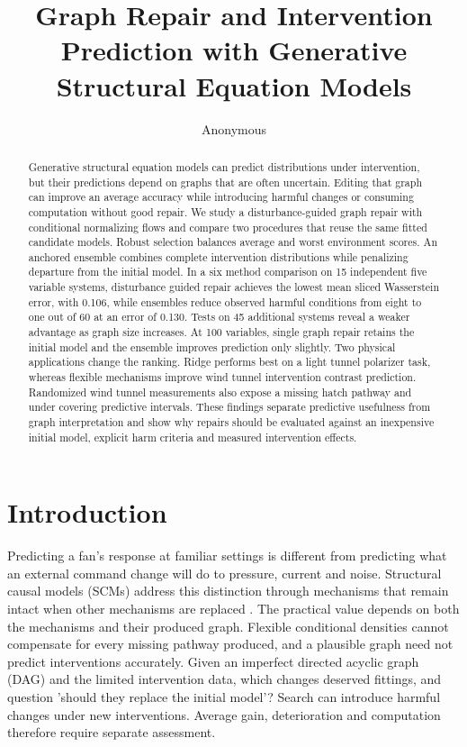 \documentclass{svproc}
\begin{document}
\mainmatter
\title{Graph Repair and Intervention Prediction with Generative Structural Equation Models}
\author{Anonymous}
\institute{}
\maketitle
\begin{abstract}
Generative structural equation models can predict distributions under intervention,
but their predictions depend on  graphs that are often uncertain. Editing that graph
can improve an  average accuracy while introducing harmful changes or consuming
computation without good repair. We study a disturbance-guided graph repair with
conditional normalizing flows and compare two procedures that reuse the same fitted
candidate models. Robust selection balances average and worst environment scores.
An anchored ensemble combines complete intervention distributions while penalizing
departure from the initial model. In a six method comparison on 15 independent
five variable systems, disturbance guided repair achieves the lowest mean
sliced Wasserstein error, with 0.106, while ensembles reduce observed harmful
conditions from eight to one out of 60 at an error of 0.130. Tests on 45 additional
systems reveal a weaker advantage as graph size increases. At 100 variables,
single graph repair retains the initial model and the ensemble improves prediction
only slightly. Two physical applications change the ranking. Ridge performs best
on a light tunnel polarizer task, whereas flexible mechanisms improve wind tunnel
intervention contrast prediction. Randomized wind tunnel measurements also expose
a missing hatch pathway and under covering predictive intervals. These findings
separate predictive usefulness from graph interpretation and show why repairs
should be evaluated against an inexpensive initial model, explicit harm criteria
and measured intervention effects.
\end{abstract}


\section{Introduction}
Predicting a fan's response at familiar settings is different from predicting
what an external command change will do to pressure, current and noise.
Structural causal models (SCMs) address this distinction through mechanisms that remain
intact when other mechanisms are replaced \cite{pearl2009}. The practical value
depends on both the mechanisms and their produced graph. Flexible conditional densities
cannot compensate for every missing pathway produced, and a plausible graph need not
predict interventions accurately.
Given an imperfect directed acyclic graph (DAG) and the limited intervention data, which
changes deserved fittings, and question 'should they replace the initial model'?
Search can introduce harmful changes under new interventions. Average gain,
deterioration and computation therefore require separate assessment.
\end{document}
